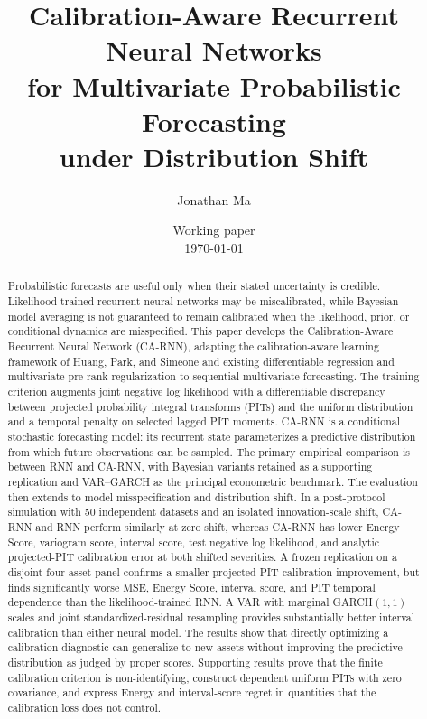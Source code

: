 \documentclass[11pt]{article}
\title{Calibration-Aware Recurrent Neural Networks\\
for Multivariate Probabilistic Forecasting\\
under Distribution Shift}
\author{Jonathan Ma}
\date{Working paper\\\today}
\begin{document}
\hypersetup{pageanchor=false}
\maketitle

\begin{abstract}
Probabilistic forecasts are useful only when their stated uncertainty is credible.
Likelihood-trained recurrent neural networks may be miscalibrated, while Bayesian
model averaging is not guaranteed to remain calibrated when the likelihood, prior,
or conditional dynamics are misspecified. This paper develops the
Calibration-Aware Recurrent Neural Network (CA-RNN), adapting the
calibration-aware learning framework of Huang, Park, and
Simeone and existing differentiable regression and multivariate pre-rank
regularization to sequential multivariate forecasting. The training criterion
augments joint negative log likelihood with a differentiable discrepancy between
projected probability integral transforms (PITs) and the uniform distribution
and a temporal penalty on selected lagged PIT moments. CA-RNN is a conditional
stochastic forecasting model: its recurrent
state parameterizes a predictive distribution from which future observations can
be sampled. The primary empirical comparison is between RNN and CA-RNN, with
Bayesian variants retained as a supporting replication and VAR--GARCH as the
principal econometric benchmark. The evaluation then extends to model
misspecification and distribution shift. In a post-protocol simulation with 50
independent datasets and an isolated innovation-scale shift, CA-RNN and RNN
perform similarly at zero shift, whereas CA-RNN has lower Energy Score,
variogram score, interval score, test negative log likelihood, and analytic
projected-PIT calibration error at both shifted severities. A frozen replication on a disjoint
four-asset panel confirms a smaller projected-PIT calibration improvement, but
finds significantly worse MSE, Energy Score, interval score, and PIT temporal
dependence than the likelihood-trained RNN. A VAR with marginal GARCH$(1,1)$
scales and joint standardized-residual resampling provides substantially better
interval calibration than either neural model. The results show that directly
optimizing a calibration diagnostic can generalize to new assets without
improving the predictive distribution as judged by proper scores. Supporting
results prove that the finite calibration criterion is non-identifying, construct
dependent uniform PITs with zero covariance, and express Energy and interval-score
regret in quantities that the calibration loss does not control.
\end{abstract}
\end{document}
